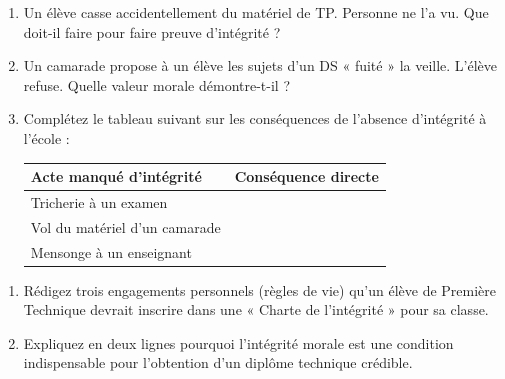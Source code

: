 \documentclass[11pt]{article}
\begin{document}
\begin{exercice}
\begin{enumerate}
    \item Un élève casse accidentellement du matériel de TP. Personne ne l'a vu. Que doit-il faire pour faire preuve d'intégrité ?
    \item Un camarade propose à un élève les sujets d'un DS « fuité » la veille. L'élève refuse. Quelle valeur morale démontre-t-il ?
    \item Complétez le tableau suivant sur les conséquences de l'absence d'intégrité à l'école :
    \begin{tabular}{|p{5cm}|p{5cm}|}
        \hline
        \textbf{Acte manqué d'intégrité} & \textbf{Conséquence directe} \\
        \hline
        Tricherie à un examen & \\
        \hline
        Vol du matériel d'un camarade & \\
        \hline
        Mensonge à un enseignant & \\
        \hline
    \end{tabular}
\end{enumerate}
\end{exercice}

\begin{exercice}
\begin{enumerate}
    \item Rédigez trois engagements personnels (règles de vie) qu'un élève de Première Technique devrait inscrire dans une « Charte de l'intégrité » pour sa classe.
    \item Expliquez en deux lignes pourquoi l'intégrité morale est une condition indispensable pour l'obtention d'un diplôme technique crédible.
\end{enumerate}
\end{exercice}
\end{document}
